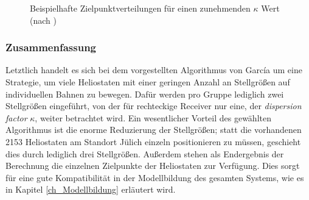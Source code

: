 \begin{figure}[h!]
    \centering
    \setlength{\fboxsep}{1pt}
    \setlength{\fboxrule}{1pt}
    \caption[Beispielhafte Zielpunktverteilungen für einen zunehmenden $\kappa$ Wert]{Beispielhafte Zielpunktverteilungen für einen zunehmenden $\kappa$ Wert (nach \mbox{\cite[S.11]{Garcia2}})}
    \label{fig_GarciaZielpunkte}
\end{figure}

\subsubsection*{Zusammenfassung} \label{subsubsec_Zusammenfassung}
Letztlich handelt es sich bei dem vorgestellten Algorithmus von García um eine Strategie, um viele Heliostaten mit einer geringen Anzahl an Stellgrößen auf individuellen Bahnen zu bewegen.
Dafür werden pro Gruppe lediglich zwei Stellgrößen eingeführt, von der für rechteckige Receiver nur eine, der \textit{dispersion factor} $\kappa$, weiter betrachtet wird.
Ein wesentlicher Vorteil des gewählten Algorithmus ist die enorme Reduzierung der Stellgrößen; statt die vorhandenen 2153 Heliostaten am Standort Jülich einzeln positionieren zu müssen, geschieht dies durch lediglich drei Stellgrößen.
Außerdem stehen als Endergebnis der Berechnung die einzelnen Zielpunkte der Heliostaten zur Verfügung.
Dies sorgt für eine gute Kompatibilität in der Modellbildung des gesamten Systems, wie es in Kapitel \ref{ch_Modellbildung} erläutert wird.


